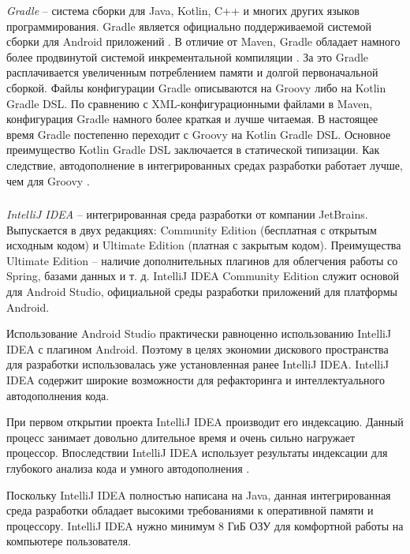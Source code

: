 \textit{Gradle} -- система сборки для Java, Kotlin, C++ и многих других языков программирования.
Gradle является официально поддерживаемой системой сборки для Android приложений \cite{android_build}.
В отличие от Maven, Gradle обладает намного более продвинутой системой инкрементальной компиляции \cite{gradle_vs_maven}.
За это Gradle расплачивается увеличенным потреблением памяти и долгой первоначальной сборкой.
Файлы конфигурации Gradle описываются на Groovy либо на Kotlin Gradle DSL.
По сравнению с XML-конфигурационными файлами в Maven, конфигурация Gradle намного более краткая и лучше читаемая.
В настоящее время Gradle постепенно переходит с Groovy на Kotlin Gradle DSL.
Основное преимущество Kotlin Gradle DSL заключается в статической типизации.
Как следствие, автодополнение в интегрированных средах разработки работает лучше, чем для Groovy \cite{kotlin_gradle_dsl_pros}.

\subsubsection{}
\label{subsub:theory_and_motivation:tools:intellij_idea}

\textit{IntelliJ IDEA} -- интегрированная среда разработки от компании JetBrains.
Выпускается в двух редакциях: Community Edition (бесплатная с открытым исходным кодом) и Ultimate Edition (платная с закрытым кодом).
Преимущества Ultimate Edition -- наличие дополнительных плагинов для облегчения работы со Spring, базами данных и т. д.
IntelliJ IDEA Community Edition служит основой для Android Studio, официальной среды разработки приложений для платформы Android.

Использование Android Studio практически равноценно использованию IntelliJ IDEA с плагином Android.
Поэтому в целях экономии дискового пространства для разработки использовалась уже установленная ранее IntelliJ IDEA.
IntelliJ IDEA содержит широкие возможности для рефакторинга и интеллектуального автодополнения кода.

При первом открытии проекта IntelliJ IDEA производит его индексацию.
Данный процесс занимает довольно длительное время и очень сильно нагружает процессор.
Впоследствии IntelliJ IDEA использует результаты индексации для глубокого анализа кода и умного автодополнения \cite{intellij_idea_features}.

Поскольку IntelliJ IDEA полностью написана на Java, данная интегрированная среда разработки обладает высокими требованиями к оперативной памяти и процессору.
IntelliJ IDEA нужно минимум 8 ГиБ ОЗУ для комфортной работы на компьютере пользователя.
